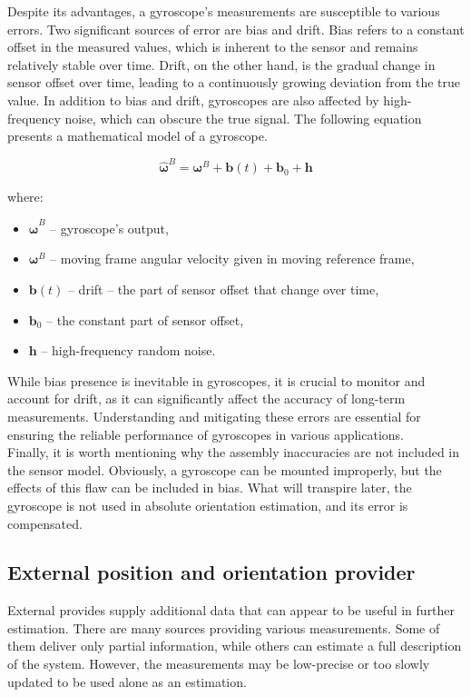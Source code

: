 Despite its advantages, a gyroscope's measurements are susceptible to various errors. Two significant sources of error are bias and drift. Bias refers to a constant offset in the measured values, which is inherent to the sensor and remains relatively stable over time. Drift, on the other hand, is the gradual change in sensor offset over time, leading to a continuously growing deviation from the true value. In addition to bias and drift, gyroscopes are also affected by high-frequency noise, which can obscure the true signal. The following equation presents a mathematical model of a gyroscope.

\begin{equation}
	\bm{\hat{\omega}}^B = \bm{\omega}^B + \bm{b}(t) + \bm{b}_0 + \bm{h}
	\label{gyro_model}
\end{equation}

where:
\begin{itemize}
	\item $\bm{\hat{\omega}}^B$ -- gyroscope's output,
	\item $\bm{\omega}^B$ -- moving frame angular velocity given in moving reference frame,
	\item $\bm{b}(t)$ -- drift -- the part of sensor offset that change over time,
	\item $\bm{b}_0$ -- the constant part of sensor offset,
	\item $\bm{h}$ -- high-frequency random noise.
\end{itemize}

While bias presence is inevitable in gyroscopes, it is crucial to monitor and account for drift, as it can significantly affect the accuracy of long-term measurements. Understanding and mitigating these errors are essential for ensuring the reliable performance of gyroscopes in various applications.\\

Finally, it is worth mentioning why the assembly inaccuracies are not included in the sensor model. Obviously, a gyroscope can be mounted improperly, but the effects of this flaw can be included in bias. What will transpire later, the gyroscope is not used in absolute orientation estimation, and its error is compensated.

\subsection{External position and orientation provider}

External provides supply additional data that can appear to be useful in further estimation. There are many sources providing various measurements. Some of them deliver only partial information, while others can estimate a full description of the system. However, the measurements may be low-precise or too slowly updated to be used alone as an estimation.\\

